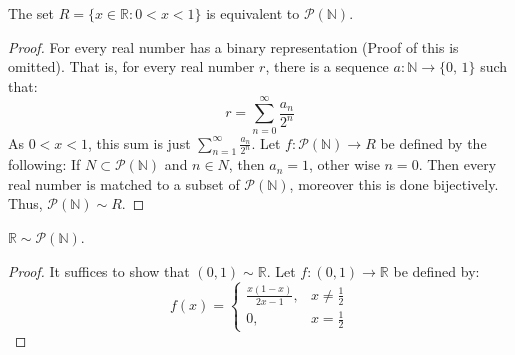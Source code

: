         \begin{theorem}
            The set $R=\{x\in \mathbb{R}:0<x<1\}$ is equivalent to
            $\mathcal{P}(\mathbb{N})$.
        \end{theorem}
        \begin{proof}
            For every real number has a binary representation (Proof of this
            is omitted). That is, for every real number $r$, there is a sequence
            $a:\mathbb{N}\rightarrow\{0,\,1\}$ such that:
            \begin{equation}
                r=\sum_{n=0}^{\infty}\frac{a_{n}}{2^{n}}
            \end{equation}
        As $0<x<1$, this sum is just $\sum_{n=1}^{\infty} \frac{a_n}{2^n}$.
        Let $f:\mathcal{P}(\mathbb{N})\rightarrow R$ be defined by the
        following: If $N\subset \mathcal{P}(\mathbb{N})$ and $n\in N$, then
        $a_{n}=1$, other wise $n=0$. Then every real number is matched to a
        subset of $\mathcal{P}(\mathbb{N})$, moreover this is done bijectively.
        Thus, $\mathcal{P}(\mathbb{N})\sim R$.
        \end{proof}
        \begin{theorem}
            $\mathbb{R}\sim\mathcal{P}(\mathbb{N})$.
        \end{theorem}
        \begin{proof}
            It suffices to show that $(0,1)\sim\mathbb{R}$.
            Let $f:(0,1)\rightarrow\mathbb{R}$ be defined by:
            \begin{equation}
                f(x)=
                \begin{cases}
                    \frac{x(1-x)}{2x-1},&x\ne\frac{1}{2}\\
                    0,&x=\frac{1}{2}
                \end{cases}
            \end{equation}
        \end{proof}